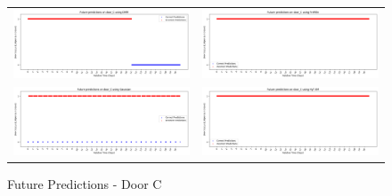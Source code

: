 \begin{figure}
  \begin{tabular}{cc}
    {\includegraphics[width = 3in]{images/results/Future_door_C_DMM.png}} &
    {\includegraphics[width = 3in]{images/results/Future_door_C_FreMEn.png}} \\
    {\includegraphics[width = 3in]{images/results/Future_door_C_Gaussian.png}} &
    {\includegraphics[width = 3in]{images/results/Future_door_C_HyT-EM.png}} \\
  \end{tabular}
  \caption{Future Predictions - Door C}
\end{figure}\\ \\

